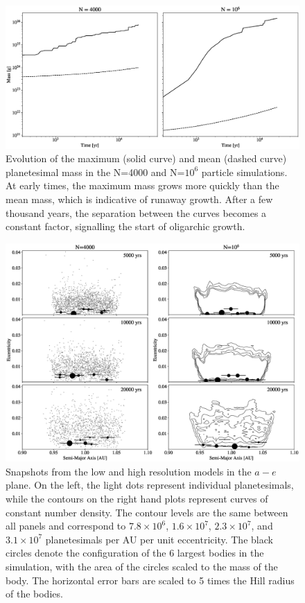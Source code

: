 \begin{figure}
    \includegraphics[width=\textwidth]{figures/plSS/mass_evo.eps}
    \caption{Evolution of the maximum (solid curve) and mean (dashed curve) planetesimal mass in the N=4000 and N=$10^6$ particle simulations. At early times, the maximum mass grows more quickly than the mean mass, which is indicative of runaway growth. After a few thousand years, the separation between the curves becomes a constant factor, signalling the start of oligarchic growth.
    \label{fig:mass_evo}}
\end{figure}

\begin{figure}
    \includegraphics[width=\textwidth]{figures/plSS/ecc_evo.eps}
    \caption{Snapshots from the low and high resolution models in the $a-e$ plane. On the left, the light dots represent individual planetesimals, while the contours on the right hand plots represent curves of constant number density. The contour levels are the same between all panels and correspond to $7.8 \times 10^6$, $1.6 \times 10^7$, $2.3 \times 10^7$, and $3.1 \times 10^7$ planetesimals per AU per unit eccentricity. The black circles denote the configuration of the 6 largest bodies in the simulation, with the area of the circles scaled to the mass of the body. The horizontal error bars are scaled to 5 times the Hill radius of the bodies.
    \label{fig:ae}}
\end{figure}

